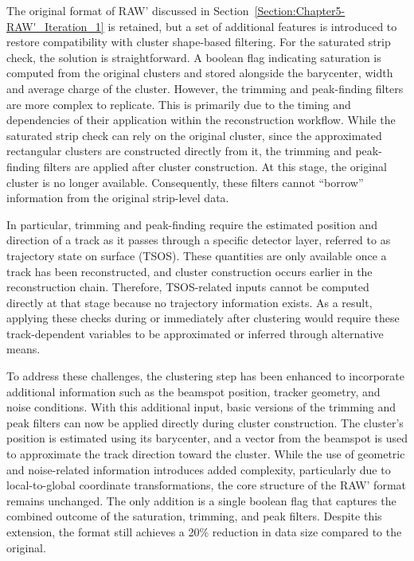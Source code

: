 The original format of RAW' discussed in Section~\ref{Section:Chapter5-RAW'_Iteration_1} is retained, but a set of additional features is introduced to restore compatibility with cluster shape-based filtering. For the saturated strip check, the solution is straightforward. A boolean flag indicating saturation is computed from the original clusters and stored alongside the barycenter, width and average charge of the cluster. However, the trimming and peak-finding filters are more complex to replicate. This is primarily due to the timing and dependencies of their application within the reconstruction workflow. While the saturated strip check can rely on the original cluster, since the approximated rectangular clusters are constructed directly from it, the trimming and peak-finding filters are applied after cluster construction. At this stage, the original cluster is no longer available. Consequently, these filters cannot ``borrow'' information from the original strip-level data.

In particular, trimming and peak-finding require the estimated position and direction of a track as it passes through a specific detector layer, referred to as trajectory state on surface (TSOS). These quantities are only available once a track has been reconstructed, and cluster construction occurs earlier in the reconstruction chain. Therefore, TSOS-related inputs cannot be computed directly at that stage because no trajectory information exists. As a result, applying these checks during or immediately after clustering would require these track-dependent variables to be approximated or inferred through alternative means.

To address these challenges, the clustering step has been enhanced to incorporate additional information such as the beamspot position, tracker geometry, and noise conditions. With this additional input, basic versions of the trimming and peak filters can now be applied directly during cluster construction. The cluster’s position is estimated using its barycenter, and a vector from the beamspot is used to approximate the track direction toward the cluster. While the use of geometric and noise-related information introduces added complexity, particularly due to local-to-global coordinate transformations, the core structure of the RAW' format remains unchanged. The only addition is a single boolean flag that captures the combined outcome of the saturation, trimming, and peak filters. Despite this extension, the format still achieves a 20\% reduction in data size compared to the original.

